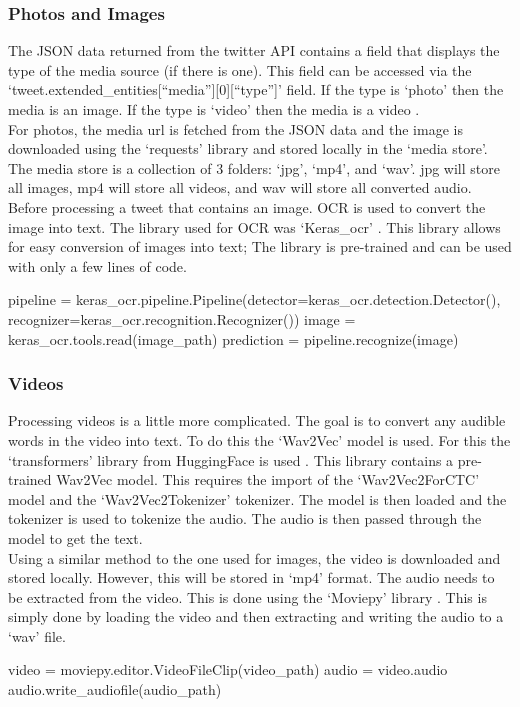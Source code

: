 \subsubsection{Photos and Images}
The JSON data returned from the twitter API contains a field that displays the type of the media source (if there is one). This field can be accessed
via the `tweet.extended\_entities[``media''][0][``type'']' field. If the type is `photo' then the media is an image. If the type is `video' then the 
media is a video \cite{tweepy}.\\
For photos, the media url is fetched from the JSON data and the image is downloaded using the `requests' library and stored locally in the `media store'.
The media store is a collection of 3 folders: `jpg', `mp4', and `wav'. jpg will store all images, mp4 will store all videos, and wav will store all converted audio.\\
Before processing a tweet that contains an image. OCR is used to convert the image into text. The library used for OCR was `Keras\_ocr' \cite{keras_ocr}. This library allows for
easy conversion of images into text; The library is pre-trained and can be used with only a few lines of code.
\begin{algorithm}
    \begin{algorithmic}
        \STATE pipeline = keras\_ocr.pipeline.Pipeline(detector=keras\_ocr.detection.Detector(), recognizer=keras\_ocr.recognition.Recognizer())
        \STATE image = keras\_ocr.tools.read(image\_path)
        \STATE prediction = pipeline.recognize(image)
    \end{algorithmic}
\end{algorithm}

\subsubsection{Videos}
Processing videos is a little more complicated. The goal is to convert any audible words in the video into text. To do this the `Wav2Vec' model is used. For this
the `transformers' library from HuggingFace is used \cite{transformers}. This library contains a pre-trained Wav2Vec model. This requires the import of the `Wav2Vec2ForCTC' model and
the `Wav2Vec2Tokenizer' tokenizer. The model is then loaded and the tokenizer is used to tokenize the audio. The audio is then passed through the model to get
the text.\\
Using a similar method to the one used for images, the video is downloaded and stored locally. However, this will be stored in `mp4' format. The audio needs to
be extracted from the video. This is done using the `Moviepy' library \cite{moviepy}. This is simply done by loading the video and then extracting and writing the audio to
a `wav' file.
\begin{algorithm}
    \begin{algorithmic}
        \STATE video = moviepy.editor.VideoFileClip(video\_path)
        \STATE audio = video.audio
        \STATE audio.write\_audiofile(audio\_path)
    \end{algorithmic}
\end{algorithm}

